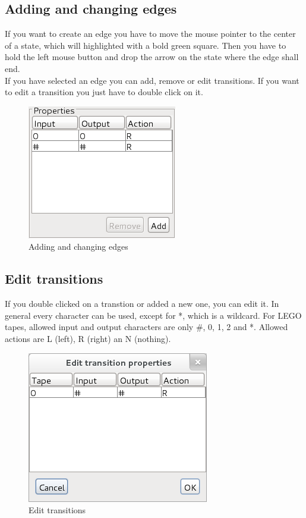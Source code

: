 \documentclass[%
  a4paper,%
  11pt,%
  blue,%
  hyperref	%
  ]{tubsartcl}
\begin{document}
\newpage

\subsection{Adding and changing edges}
\label{sec:adding-chang-edges}
If you want to create an edge you have to move the mouse pointer to the center of a state, which will highlighted with a bold green square. Then you have to hold the left mouse button and drop the arrow on the state where the edge shall end. \\
If you have selected an edge you can add, remove or edit transitions. If you want to edit a transition you just have to double click on it.
\begin{figure}[!htb]
\begin{center}
\includegraphics[scale=0.5]{graphics_gui/edge_properties.png}
\end{center}
\caption{Adding and changing edges}
\label{pic:edge_properties}
\end{figure}

\newpage

\subsection{Edit transitions}
\label{sec:edit-transitions}
If you double clicked on a transtion or added a new one, you can edit it. In general every character can be used, except for *, which is a wildcard. For LEGO tapes, allowed input and output characters are only \#, 0, 1, 2 and *. Allowed actions are L (left), R (right) an N (nothing).
\begin{figure}[!htb]
\begin{center}
\includegraphics[scale=0.5]{graphics_gui/edit_transitions.png}
\end{center}
\caption{Edit transitions}
\label{pic:edit_transitions}
\end{figure}
\end{document}
